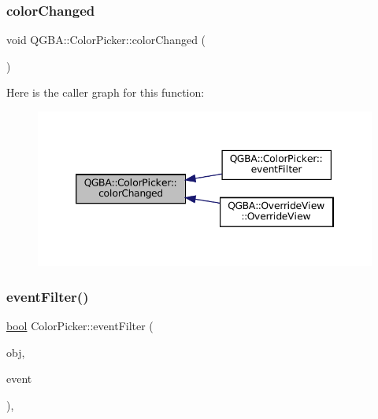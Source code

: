 \subsubsection{\texorpdfstring{color\+Changed}{colorChanged}}
{\footnotesize\ttfamily void Q\+G\+B\+A\+::\+Color\+Picker\+::color\+Changed (\begin{DoxyParamCaption}\item[{const Q\+Color \&}]{ }\end{DoxyParamCaption})\hspace{0.3cm}{\ttfamily [signal]}}

Here is the caller graph for this function\+:
\nopagebreak
\begin{figure}[H]
\begin{center}
\leavevmode
\includegraphics[width=346pt]{class_q_g_b_a_1_1_color_picker_a232b00f21af8dfea674cb9c7b5858673_icgraph}
\end{center}
\end{figure}
\mbox{\label{class_q_g_b_a_1_1_color_picker_afe3820464dccd855c22def995bb05d52}} 
\subsubsection{\texorpdfstring{event\+Filter()}{eventFilter()}}
{\footnotesize\ttfamily \mbox{\hyperlink{libretro_8h_a4a26dcae73fb7e1528214a068aca317e}{bool}} Color\+Picker\+::event\+Filter (\begin{DoxyParamCaption}\item[{Q\+Object $\ast$}]{obj,  }\item[{Q\+Event $\ast$}]{event }\end{DoxyParamCaption})\hspace{0.3cm}{\ttfamily [override]}, {\ttfamily [protected]}}

